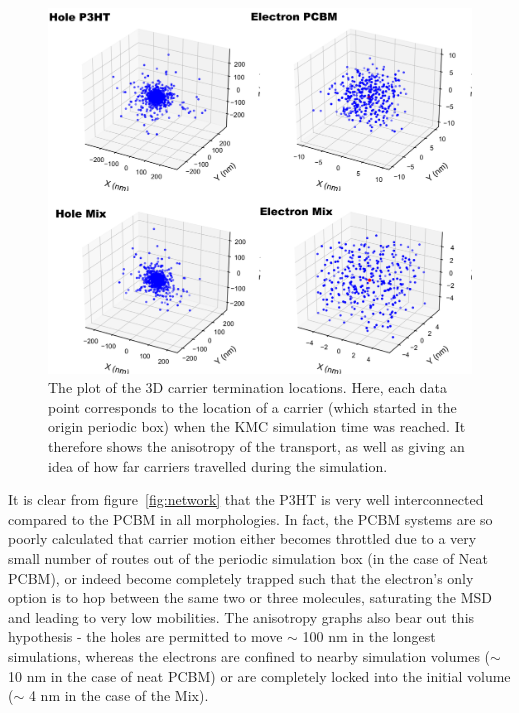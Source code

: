 \documentclass[12pt]{article}
\begin{document}
\begin{figure}[h!]\centering
	\includegraphics[width=\textwidth]{Figures/Anisotropy.pdf}
    \caption{The plot of the 3D carrier termination locations.
        Here, each data point corresponds to the location of a carrier (which started in the origin periodic box) when the KMC simulation time was reached.
    It therefore shows the anisotropy of the transport, as well as giving an idea of how far carriers travelled during the simulation.
    }
	\label{fig:anisotropy}
\end{figure}





It is clear from figure~\ref{fig:network} that the P3HT is very well interconnected compared to the PCBM in all morphologies.
In fact, the PCBM systems are so poorly calculated that carrier motion either becomes throttled due to a very small number of routes out of the periodic simulation box (in the case of Neat PCBM), or indeed become completely trapped such that the electron's only option is to hop between the same two or three molecules, saturating the MSD and leading to very low mobilities.
The anisotropy graphs also bear out this hypothesis - the holes are permitted to move $\sim$ 100 nm in the longest simulations, whereas the electrons are confined to nearby simulation volumes ($\sim$ 10 nm in the case of neat PCBM) or are completely locked into the initial volume ($\sim$ 4 nm in the case of the Mix).
\end{document}
